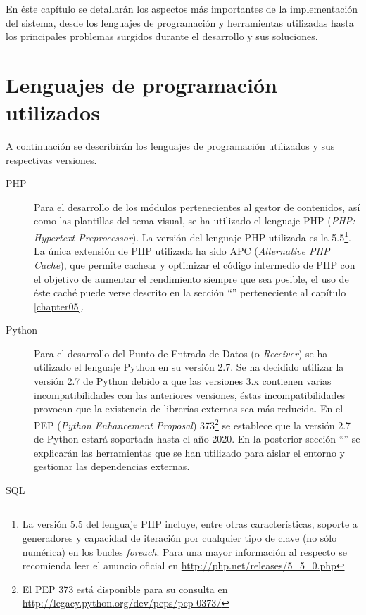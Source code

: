 En éste capítulo se detallarán los aspectos más importantes de la implementación del sistema, desde los lenguajes de programación y herramientas utilizadas hasta los principales problemas surgidos durante el desarrollo y sus soluciones.


\section{Lenguajes de programación utilizados}
\label{implementacion:lenguajes_programacion}
	
	A continuación se describirán los lenguajes de programación utilizados y sus respectivas versiones.
	\begin{description}
		\item[PHP]
			Para el desarrollo de los módulos pertenecientes al gestor de contenidos, así como las plantillas del tema visual, se ha utilizado el lenguaje PHP (\textit{PHP: Hypertext Preprocessor}).  La versión del lenguaje PHP utilizada es la 5.5\footnote{La versión 5.5 del lenguaje PHP incluye, entre otras características, soporte a generadores y capacidad de iteración por cualquier tipo de clave (no sólo numérica) en los bucles \textit{foreach}.  Para una mayor información al respecto se recomienda leer el anuncio oficial en \url{http://php.net/releases/5_5_0.php}}.  La única extensión de PHP utilizada ha sido APC (\textit{Alternative PHP Cache}), que permite cachear y optimizar el código intermedio de PHP con el objetivo de aumentar el rendimiento siempre que sea posible, el uso de éste caché puede verse descrito en la sección ``'' perteneciente al capítulo \ref{chapter05}.
		\item[Python]
			Para el desarrollo del Punto de Entrada de Datos (o \textit{Receiver}) se ha utilizado el lenguaje Python en su versión 2.7. Se ha decidido utilizar la versión 2.7 de Python debido a que las versiones 3.x contienen varias incompatibilidades con las anteriores versiones, éstas incompatibilidades provocan que la existencia de librerías externas sea más reducida.  En el PEP (\textit{Python Enhancement Proposal}) 373\footnote{El PEP 373 está disponible para su consulta en \url{http://legacy.python.org/dev/peps/pep-0373/}} se establece que la versión 2.7 de Python estará soportada hasta el año 2020.  En la posterior sección ``'' se explicarán las herramientas que se han utilizado para aislar el entorno y gestionar las dependencias externas.
		\item[SQL]

\end{description}
